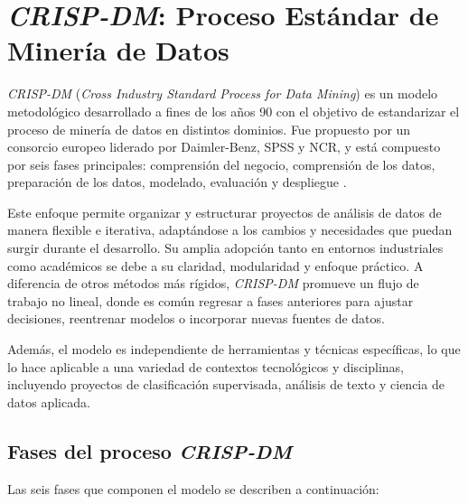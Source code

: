 \section{\textit{CRISP-DM}: Proceso Estándar de Minería de Datos}

\textit{CRISP-DM} (\textit{Cross Industry Standard Process for Data Mining}) es un modelo metodológico desarrollado a fines de los años 90 con el objetivo de estandarizar el proceso de minería de datos en distintos dominios. Fue propuesto por un consorcio europeo liderado por Daimler-Benz, SPSS y NCR, y está compuesto por seis fases principales: comprensión del negocio, comprensión de los datos, preparación de los datos, modelado, evaluación y despliegue \parencite{chapman2000crisp,wirth2000crisp}.

Este enfoque permite organizar y estructurar proyectos de análisis de datos de manera flexible e iterativa, adaptándose a los cambios y necesidades que puedan surgir durante el desarrollo. Su amplia adopción tanto en entornos industriales como académicos se debe a su claridad, modularidad y enfoque práctico. A diferencia de otros métodos más rígidos, \textit{CRISP-DM} promueve un flujo de trabajo no lineal, donde es común regresar a fases anteriores para ajustar decisiones, reentrenar modelos o incorporar nuevas fuentes de datos.

Además, el modelo es independiente de herramientas y técnicas específicas, lo que lo hace aplicable a una variedad de contextos tecnológicos y disciplinas, incluyendo proyectos de clasificación supervisada, análisis de texto y ciencia de datos aplicada.

\subsection{Fases del proceso \textit{CRISP-DM}}

Las seis fases que componen el modelo se describen a continuación:

